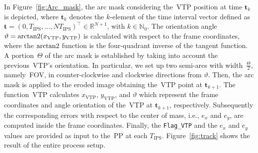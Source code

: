 In Figure~\ref{fig:Arc_mask}, the arc mask considering the~\gls{VTP} position at time $\mathbf{t}_k$ is depicted, where $\mathbf{t}_k$ denotes the $k$-element of the time interval vector defined as $\mathbf{t} =(0, T_\mathrm{IPS}, \dots, NT_\mathrm{IPS})^\top \in \mathbb{R}^{N+1}$, with $k \in \mathbb{N}_0$. The orientation angle \mbox{$\vartheta = \operatorname{arctan2}(x_\mathrm{VTP},y_\mathrm{VTP})$} is calculated with respect to the frame coordinates, where the $\operatorname{arctan2}$ function is the four-quadrant inverse of the tangent function. A portion~$\varTheta$ of the arc mask is established by taking into account the previous~\gls{VTP}'s orientation. In particular, we set up two semi-arcs with width~$\frac{\varTheta}{2}$, namely~\gls{FOV}, in counter-clockwise and clockwise directions from $\vartheta$. Then, the arc mask is applied to the eroded image obtaining the~\gls{VTP} point at $\mathbf{t}_{k+1}$. The function~\gls{VTP} calculates $x_\mathrm{VTP}$, $y_\mathrm{VTP}$, and $\vartheta$ which represent the frame coordinates and angle orientation of the~\gls{VTP} at  $\mathbf{t}_{k+1}$, respectively. Subsequently the corresponding errors with respect to the center of mass, i.e., $e_x$ and $e_y$, are computed inside the frame coordinates. Finally, the \texttt{Flag\_VTP} and the $e_x$ and $e_y$ values are provided as input to the~\gls{PP} at each $T_\mathrm{IPS}$. Figure~\ref{fig:track} shows the result of the entire process setup. 

